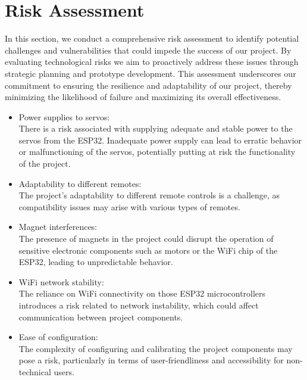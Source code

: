 \section{Risk Assessment}

In this section, we conduct a comprehensive risk assessment to identify potential challenges and vulnerabilities that could impede the success of our project.
By evaluating technological risks we aim to proactively address these issues through strategic planning and prototype development.
This assessment underscores our commitment to ensuring the resilience and adaptability of our project, thereby minimizing the likelihood of failure and maximizing its overall effectiveness.

\begin{itemize}
    \item Power supplies to servos:\\
        There is a risk associated with supplying adequate and stable power to the servos from the ESP32.
        Inadequate power supply can lead to erratic behavior or malfunctioning of the servos, potentially putting at risk the functionality of the project.
    \item Adaptability to different remotes:\\
        The project's adaptability to different remote controls is a challenge, as compatibility issues may arise with various types of remotes.
    \item Magnet interferences:\\
        The presence of magnets in the project could disrupt the operation of sensitive electronic components such as motors or the WiFi chip of the ESP32, leading to unpredictable behavior.
    \item WiFi network stability:\\
        The reliance on WiFi connectivity on those ESP32 microcontrollers introduces a risk related to network instability, which could affect communication between project components.
    \item Ease of configuration:\\
        The complexity of configuring and calibrating the project components may pose a risk, particularly in terms of user-friendliness and accessibility for non-technical users. 
\end{itemize}
